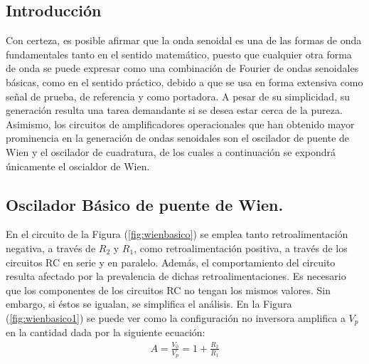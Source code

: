 \subsection{Introducción}
Con certeza, es posible afirmar que la onda senoidal es una de las formas de onda fundamentales tanto en el sentido matemático, puesto que cualquier otra forma de onda se puede expresar como una combinación de Fourier de ondas senoidales básicas, como en el
sentido práctico, debido a que se usa en forma extensiva como señal de prueba, de referencia
y como portadora. A pesar de su simplicidad, su generación resulta una tarea demandante si
se desea estar cerca de la pureza. Asimismo, los circuitos de amplificadores operacionales que han obtenido
mayor prominencia en la generación de ondas senoidales son el oscilador de puente de Wien
y el oscilador de cuadratura, de los cuales a continuación se expondrá únicamente el oscialdor de Wien.

\subsection{Oscilador Básico de puente de Wien.}
En el circuito de la Figura (\ref{fig:wienbasico}) se emplea tanto retroalimentación negativa, a través de $R_2$ y $R_1$, como retroalimentación positiva, a través de los circuitos RC en serie y en paralelo. Además, el comportamiento del circuito resulta afectado por la prevalencia de dichas retroalimentaciones. Es necesario que los componentes de los circuitos RC no tengan los mismos valores. Sin embargo, si éstos se igualan, se simplifica el análisis. En la Figura (\ref{fig:wienbasico1}) se puede ver como la configuración no inversora amplifica a $V_p$ en la cantidad dada por la siguiente ecuación:
\begin{align}
	A=\frac{V_0}{V_p}=1+\frac{R_2}{R_1}
\end{align}


